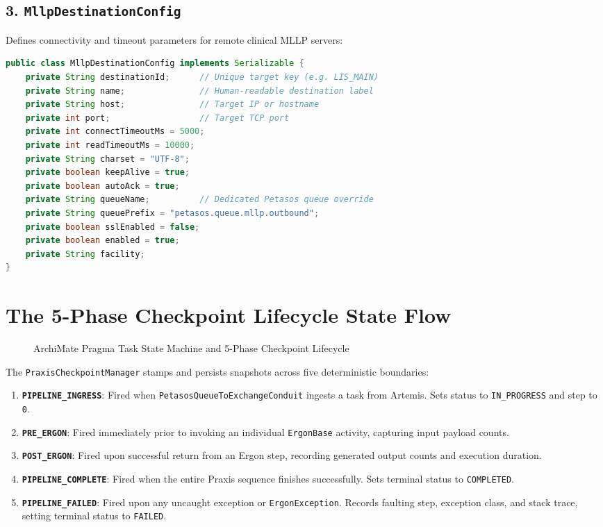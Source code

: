 \subsection{3. \texttt{MllpDestinationConfig}}
Defines connectivity and timeout parameters for remote clinical MLLP servers:
\begin{lstlisting}[language=Java, caption={MllpDestinationConfig Model Definition}]
public class MllpDestinationConfig implements Serializable {
    private String destinationId;      // Unique target key (e.g. LIS_MAIN)
    private String name;               // Human-readable destination label
    private String host;               // Target IP or hostname
    private int port;                  // Target TCP port
    private int connectTimeoutMs = 5000;
    private int readTimeoutMs = 10000;
    private String charset = "UTF-8";
    private boolean keepAlive = true;
    private boolean autoAck = true;
    private String queueName;          // Dedicated Petasos queue override
    private String queuePrefix = "petasos.queue.mllp.outbound";
    private boolean sslEnabled = false;
    private boolean enabled = true;
    private String facility;
}
\end{lstlisting}

\section{The 5-Phase Checkpoint Lifecycle State Flow}

\begin{figure}[htbp]
    \centering
    \begin{adjustbox}{max width=\textwidth}
        
    \end{adjustbox}
    \caption{ArchiMate Pragma Task State Machine and 5-Phase Checkpoint Lifecycle}
    \label{fig:pragma_state_flow}
\end{figure}

The \texttt{PraxisCheckpointManager} stamps and persists snapshots across five deterministic boundaries:
\begin{enumerate}
    \item \textbf{\texttt{PIPELINE\_INGRESS}}: Fired when \texttt{PetasosQueueToExchangeConduit} ingests a task from Artemis. Sets status to \texttt{IN\_PROGRESS} and step to \texttt{0}.
    \item \textbf{\texttt{PRE\_ERGON}}: Fired immediately prior to invoking an individual \texttt{ErgonBase} activity, capturing input payload counts.
    \item \textbf{\texttt{POST\_ERGON}}: Fired upon successful return from an Ergon step, recording generated output counts and execution duration.
    \item \textbf{\texttt{PIPELINE\_COMPLETE}}: Fired when the entire Praxis sequence finishes successfully. Sets terminal status to \texttt{COMPLETED}.
    \item \textbf{\texttt{PIPELINE\_FAILED}}: Fired upon any uncaught exception or \texttt{ErgonException}. Records faulting step, exception class, and stack trace, setting terminal status to \texttt{FAILED}.
\end{enumerate}

